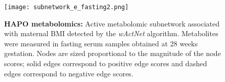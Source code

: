 			\begin{figure}[!hbt]
				\centering
				\texttt{[image: subnetwork\_e\_fasting2.png]}		
				\caption{{\bf HAPO metabolomics:} Active metabolomic subnetwork associated with maternal BMI detected by the {\it wActNet} algorithm. Metabolites were measured in fasting serum samples obtained at 28 weeks gestation. Nodes are sized proportional to the magnitude of the node scores; solid edges correspond to positive edge scores and dashed edges correspond to negative edge scores.}
				\label{plotmod11}
			\end{figure} 
